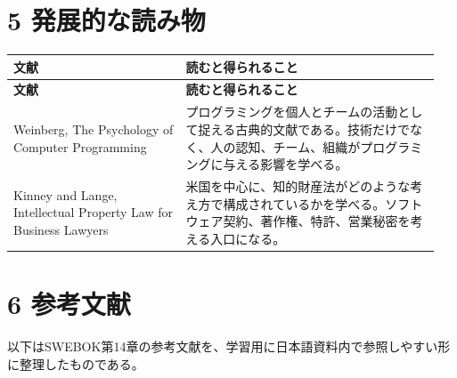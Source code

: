 \documentclass[uplatex,dvipdfmx,a4paper,11pt]{jsarticle}
\begin{document}
\section*{5 発展的な読み物}


\begin{center}
\small
\begin{longtable}{p{0.38\linewidth}p{0.57\linewidth}}
\toprule
\textbf{文献} & \textbf{読むと得られること} \\
\midrule
\endfirsthead
\toprule
\textbf{文献} & \textbf{読むと得られること} \\
\midrule
\endhead
Weinberg, The Psychology of Computer Programming & プログラミングを個人とチームの活動として捉える古典的文献である。技術だけでなく、人の認知、チーム、組織がプログラミングに与える影響を学べる。 \\
\midrule
Kinney and Lange, Intellectual Property Law for Business Lawyers & 米国を中心に、知的財産法がどのような考え方で構成されているかを学べる。ソフトウェア契約、著作権、特許、営業秘密を考える入口になる。 \\
\midrule
\bottomrule
\end{longtable}
\normalsize
\end{center}

\section*{6 参考文献}


以下はSWEBOK第14章の参考文献を、学習用に日本語資料内で参照しやすい形に整理したものである。
\end{document}
